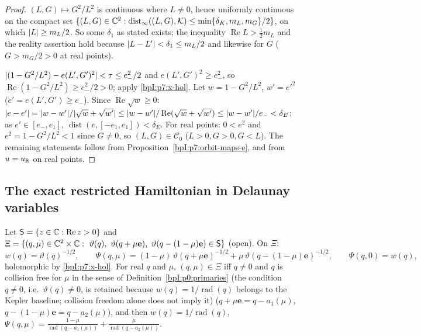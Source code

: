 \begin{proof}
\label{stepI:p7:cd-uc} $(L,G)\mapsto G^2/L^2$ is continuous where $L\ne0$, hence uniformly continuous on the compact set $\{(L,G)\in\mathbb{C}^2:\operatorname{dist}_\infty((L,G),\mathcal K)\le\min\{\delta_K,m_L,m_G\}/2\}$, on which $\lvert L\rvert\ge m_L/2$. So some $\delta_1$ as stated exists; the inequality $\operatorname{Re}L>\tfrac12m_L$ and the reality assertion hold because $\lvert L-L'\rvert<\delta_1\le m_L/2$ and likewise for $G$ ($G>m_G/2>0$ at real points).

\label{stepI:p7:cd-branch} $\lvert (1-G^2/L^2)-e(L',G')^2\rvert<\tau\le e_-^2/2$ and $e(L',G')^2\ge e_-^2$, so $\operatorname{Re}(1-G^2/L^2)\ge e_-^2/2>0$; apply \ref{bpI:p7:x-hol}. Let $w=1-G^2/L^2$, $w'=e'^2$ ($e'=e(L',G')\ge e_-$). Since $\operatorname{Re}\sqrt w\ge0$: $\lvert e-e'\rvert=\lvert w-w'\rvert/\lvert \sqrt w+\sqrt{w'}\rvert\le\lvert w-w'\rvert/\operatorname{Re}(\sqrt w+\sqrt{w'})\le\lvert w-w'\rvert/e_-<\delta_E$; as $e'\in[e_-,e_1]$, $\operatorname{dist}(e,[-e_1,e_1])<\delta_E$. For real points: $0<e^2$ and $e^2=1-G^2/L^2<1$ since $G\ne0$, so $(L,G)\in\mathcal C_0$ ($L>0,G>0,G<L$).
The remaining statements follow from Proposition~\ref{bpI:p7:orbit-maps-e}, and from $u=u_{\mathbb{R}}$ on real points.
\end{proof}

\subsection{The exact restricted Hamiltonian in Delaunay variables}\label{bpI:p7:sec-exact}

\begin{definition}\label{bpI:p7:shift-def}
Let $\mathsf S=\{z\in\mathbb{C}:\operatorname{Re}z>0\}$ and $\Xi=\{(q,\mu)\in\C^2\times\C:\ \vartheta(q),\ \vartheta(q+\mu\mathbf e),\ \vartheta(q-(1-\mu)\mathbf e)\in\mathsf S\}$ (open). On $\Xi$:
\[
w(q)=\vartheta(q)^{-1/2},\qquad\Psi(q,\mu)=(1-\mu)\,\vartheta(q+\mu\mathbf e)^{-1/2}+\mu\,\vartheta(q-(1-\mu)\mathbf e)^{-1/2},\qquad\Psi(q,0)=w(q),
\]
holomorphic by \ref{bpI:p7:x-hol}. For real $q$ and $\mu$, $(q,\mu)\in\Xi$ iff $q\ne0$ and $q$ is collision free for $\mu$ in the sense of Definition~\ref{bpI:p0:primaries} (the condition $q\ne0$, i.e.\ $\vartheta(q)\ne0$, is retained because $w(q)=1/\operatorname{rad}(q)$ belongs to the Kepler baseline; collision freedom alone does not imply it) ($q+\mu\mathbf e=q-a_1(\mu)$, $q-(1-\mu)\mathbf e=q-a_2(\mu)$), and then $w(q)=1/\operatorname{rad}(q)$, $\Psi(q,\mu)=\frac{1-\mu}{\operatorname{rad}(q-a_1(\mu))}+\frac{\mu}{\operatorname{rad}(q-a_2(\mu))}$.
\end{definition}

